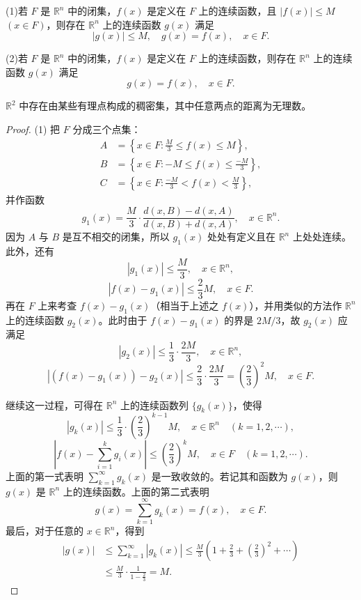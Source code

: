 \documentclass[../../main.tex]{subfiles}
\begin{document}
\begin{theorem}[连续延拓定理]\label{theorem:连续函数延拓定理}
(1)若 \(F\) 是 \(\mathbb{R}^n\) 中的闭集，\(f(x)\) 是定义在 \(F\) 上的连续函数，且 \(|f(x)|\leqslant M\) \((x\in F)\)，则存在 \(\mathbb{R}^n\) 上的连续函数 \(g(x)\) 满足
\[
|g(x)|\leqslant M, \quad g(x)=f(x), \quad x\in F.
\]

(2)若 \(F\) 是 \(\mathbb{R}^n\) 中的闭集，\(f(x)\) 是定义在 \(F\) 上的连续函数，则存在 \(\mathbb{R}^n\) 上的连续函数 \(g(x)\) 满足
\[
g(x)=f(x), \quad x\in F.
\]
\end{theorem}
\begin{remark}
\(\mathbb{R}^2\) 中存在由某些有理点构成的稠密集，其中任意两点的距离为无理数。 
\end{remark}
\begin{proof}
(1) 把 \(F\) 分成三个点集：
\begin{align*}
A&=\left\{x\in F:\frac{M}{3}\leqslant f(x)\leqslant M\right\},\\
B&=\left\{x\in F:-M\leqslant f(x)\leqslant\frac{-M}{3}\right\},\\
C&=\left\{x\in F:\frac{-M}{3}<f(x)<\frac{M}{3}\right\},
\end{align*}
并作函数
\[
g_1(x)=\frac{M}{3}\cdot\frac{d(x,B)-d(x,A)}{d(x,B)+d(x,A)}, \quad x\in\mathbb{R}^n.
\]
因为 \(A\) 与 \(B\) 是互不相交的闭集，所以 \(g_1(x)\) 处处有定义且在 \(\mathbb{R}^n\) 上处处连续。此外，还有
\[
|g_1(x)|\leqslant\frac{M}{3}, \quad x\in\mathbb{R}^n,
\]
\[
|f(x)-g_1(x)|\leqslant\frac{2}{3}M, \quad x\in F.
\]
再在 \(F\) 上来考查 \(f(x)-g_1(x)\)（相当于上述之 \(f(x)\)），并用类似的方法作 \(\mathbb{R}^n\) 上的连续函数 \(g_2(x)\)。此时由于 \(f(x)-g_1(x)\) 的界是 \(2M/3\)，故 \(g_2(x)\) 应满足
\[
|g_2(x)|\leqslant\frac{1}{3}\cdot\frac{2M}{3}, \quad x\in\mathbb{R}^n,
\]
\[
|(f(x)-g_1(x))-g_2(x)|\leqslant\frac{2}{3}\cdot\frac{2M}{3}=\left(\frac{2}{3}\right)^2M, \quad x\in F.
\]

继续这一过程，可得在 \(\mathbb{R}^n\) 上的连续函数列 \(\{g_k(x)\}\)，使得
\[
|g_k(x)|\leqslant\frac{1}{3}\cdot\left(\frac{2}{3}\right)^{k - 1}M, \quad x\in\mathbb{R}^n \quad (k = 1,2,\cdots),
\]
\[
\left|f(x)-\sum_{i = 1}^{k}g_i(x)\right|\leqslant\left(\frac{2}{3}\right)^kM, \quad x\in F \quad (k = 1,2,\cdots).
\]
上面的第一式表明 \(\sum_{k = 1}^{\infty}g_k(x)\) 是一致收敛的。若记其和函数为 \(g(x)\)，则 \(g(x)\) 是 \(\mathbb{R}^n\) 上的连续函数。上面的第二式表明
\[
g(x)=\sum_{k = 1}^{\infty}g_k(x)=f(x), \quad x\in F.
\]
最后，对于任意的 \(x\in\mathbb{R}^n\)，得到
\begin{align*}
|g(x)|&\leqslant\sum_{k = 1}^{\infty}|g_k(x)|\leqslant\frac{M}{3}\left(1+\frac{2}{3}+\left(\frac{2}{3}\right)^2+\cdots\right)\\
&\leqslant\frac{M}{3}\cdot\frac{1}{1 - \frac{2}{3}}=M.
\end{align*}


\end{proof}
\end{document}
